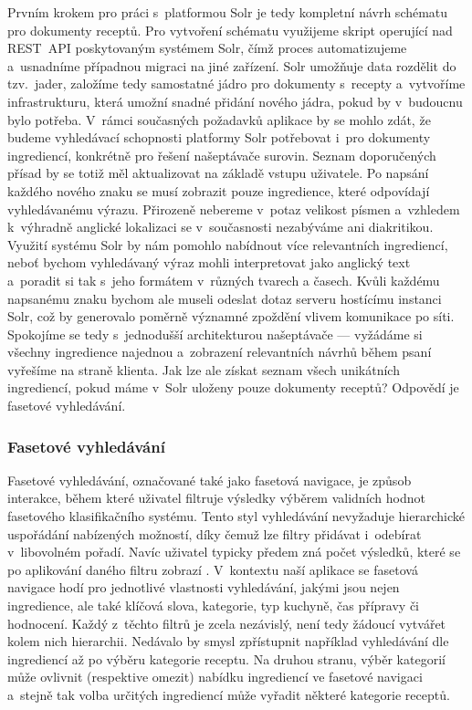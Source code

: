 Prvním krokem pro práci s~platformou Solr je tedy kompletní návrh schématu pro dokumenty receptů. Pro vytvoření schématu využijeme skript operující nad REST~API poskytovaným systémem Solr, čímž proces automatizujeme a~usnadníme případnou migraci na jiné zařízení. Solr umožňuje data rozdělit do tzv.~jader, založíme tedy samostatné jádro pro dokumenty s~recepty a~vytvoříme infrastrukturu, která umožní snadné přidání nového jádra, pokud by v~budoucnu bylo potřeba. V~rámci současných požadavků aplikace by se mohlo zdát, že budeme vyhledávací schopnosti platformy Solr potřebovat i~pro dokumenty ingrediencí, konkrétně pro řešení našeptávače surovin. Seznam doporučených přísad by se totiž měl aktualizovat na základě vstupu uživatele. Po napsání každého nového znaku se musí zobrazit pouze ingredience, které odpovídají vyhledávanému výrazu. Přirozeně nebereme v~potaz velikost písmen a~vzhledem k~výhradně anglické lokalizaci se v~současnosti nezabýváme ani diakritikou. Využití systému Solr by nám pomohlo nabídnout více relevantních ingrediencí, neboť bychom vyhledávaný výraz mohli interpretovat jako anglický text a~poradit si tak s~jeho formátem v~různých tvarech a časech. Kvůli každému napsanému znaku bychom ale museli odeslat dotaz serveru hostícímu instanci Solr, což by generovalo poměrně významné zpoždění vlivem komunikace po síti. Spokojíme se tedy s~jednodušší architekturou našeptávače --- vyžádáme si všechny ingredience najednou a~zobrazení relevantních návrhů během psaní vyřešíme na straně klienta. Jak lze ale získat seznam všech unikátních ingrediencí, pokud máme v~Solr uloženy pouze dokumenty receptů? Odpovědí je fasetové vyhledávání.

\subsubsection{Fasetové vyhledávání}

Fasetové vyhledávání, označované také jako fasetová navigace, je způsob interakce, během které uživatel filtruje výsledky výběrem validních hodnot fasetového klasifikačního systému. Tento styl vyhledávání nevyžaduje hierarchické uspořádání nabízených možností, díky čemuž lze filtry přidávat i~odebírat v~libovolném pořadí. Navíc uživatel typicky předem zná počet výsledků, které se po aplikování daného filtru zobrazí \citep{faceted-search}. V~kontextu naší aplikace se fasetová navigace hodí pro jednotlivé vlastnosti vyhledávání, jakými jsou nejen ingredience, ale také klíčová slova, kategorie, typ kuchyně, čas přípravy či hodnocení. Každý z~těchto filtrů je zcela nezávislý, není tedy žádoucí vytvářet kolem nich hierarchii. Nedávalo by smysl zpřístupnit například vyhledávání dle ingrediencí až po výběru kategorie receptu. Na druhou stranu, výběr kategorií může ovlivnit (respektive omezit) nabídku ingrediencí ve fasetové navigaci a~stejně tak volba určitých ingrediencí může vyřadit některé kategorie receptů.


